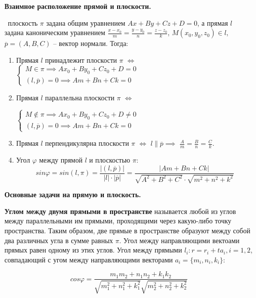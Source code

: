 \textbf{Взаимное расположение прямой и плоскости.} 

\mathLet \ плоскость $\pi$ задана общим уравнением $Ax + By + Cz + D = 0$, а прямая $l$ задана каноническим уравнением $\frac{x-x_0}{m} = \frac{y-y_0}{n} = \frac{z-z_0}{k}$, $M(x_0, y_0, z_0) \in l$, $\overline{p} = (A, B, C)$ -- вектор нормали. Тогда:
\begin{enumerate}
    \item Прямая $l$ принадлежит плоскости $\pi$ $\iff$ \newline
    $
    \begin{cases}
        M \in \pi \implies Ax_0 +By_0 +Cz_0 +D = 0 \\
        (l, \overline{p}) = 0  \implies Am+Bn+Ck = 0
    \end{cases}
    $
    \item Прямая $l$ параллельна плоскости $\pi$ $\iff$ \newline
    
    $\begin{cases}
        M \notin \pi \implies Ax_0+By_0+Cz_0+D\neq 0 \\
        (l, \overline{p}) = 0  \implies Am+Bn+Ck = 0
    \end{cases}$
    
    \item Прямая $l$ перпендикулярна плоскости $\pi$ $\iff$ \newline
    $l \| \overline{p} \implies$ $\frac{A}{m} = \frac{B}{n} = \frac{C}{k}$.
    
    \item Угол $\varphi$ между прямой $l$ и плоскостью $\pi$: \newline
    $$  sin\varphi = sin(l, \pi) = \frac{| (l, \overline{p}) |}{|l| \cdot |\overline{p}|} = \frac{|Am+Bn+Ck|}{\sqrt{A^2+B^2+C^2}\cdot\sqrt{m^2+n^2+k^2}}$$
\end{enumerate}
   
\textbf{Основные задачи на прямую и плоскость.}

\textbf{Углом между двумя прямыми в пространстве} называется любой из углов между параллельными им прямыми, проходящими через какую-либо точку пространства. Таким образом, две прямые в пространстве образуют между собой два различных угла в сумме равных $\pi$. Угол между направляющими вектоами прямых равен одному из этих углов. Угол между прямыми $l_i: r = r_i + ta_i, i = 1,2$, совпадающий с угом между направляющими векторами $a_i = \{m_i, n_i, k_i\}$:

$$cos\varphi = \frac{m_1m_2 + n_1n_2 + k_1k_2}{\sqrt{m_1^2 + n_1^2 + k_1^2}\sqrt{m_2^2 + n_2^2 + k_2^2}}$$

